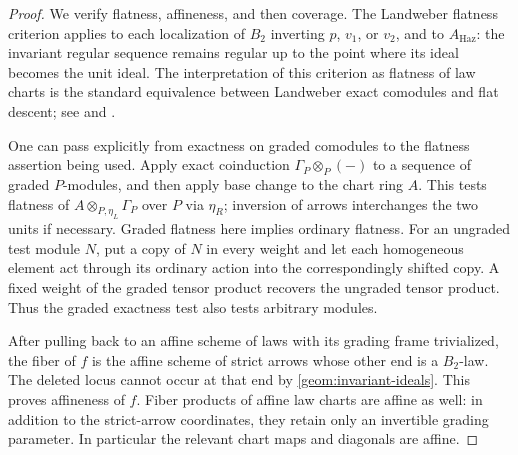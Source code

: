 \begin{proof}
We verify flatness, affineness, and then coverage.  The Landweber
flatness criterion applies to each localization of $B_2$
inverting $p$, $v_1$, or $v_2$, and to $A_{\mathrm{Haz}}$: the invariant
regular sequence remains regular up to the point where its ideal
becomes the unit ideal.  The interpretation of this criterion as
flatness of law charts is the standard equivalence between Landweber
exact comodules and flat descent; see
\cite[Lemma~2.2, Corollary~2.3, and Theorem~2.5]{HS2005}
and \cite[Section~5, Theorem~26, and Proposition~27]{Naumann2007}.

One can pass explicitly from exactness on graded comodules to the
flatness assertion being used.  Apply exact coinduction
$\Gamma_P\otimes_P(-)$ to a sequence of graded $P$-modules, and then
apply base change to the chart ring $A$.  This tests flatness of
$A\otimes_{P,\eta_L}\Gamma_P$ over $P$ via $\eta_R$; inversion of
arrows interchanges the two units if necessary.  Graded flatness here
implies ordinary flatness.  For an ungraded test module $N$, put a copy
of $N$ in every weight and let each homogeneous element act through its
ordinary action into the correspondingly shifted copy.  A fixed
weight of the graded tensor product recovers the ungraded tensor
product.  Thus the graded exactness test also tests arbitrary modules.

After pulling back to an affine scheme of laws with its grading frame
trivialized, the fiber of $f$ is the affine scheme of strict arrows
whose other end is a $B_2$-law.  The deleted locus cannot occur at that
end by \eqref{geom:invariant-ideals}.  This proves affineness of $f$.
Fiber products of affine law charts are affine as well: in addition
to the strict-arrow coordinates, they retain only an invertible
grading parameter.  In particular the relevant chart maps and
diagonals are affine.


\end{proof}
